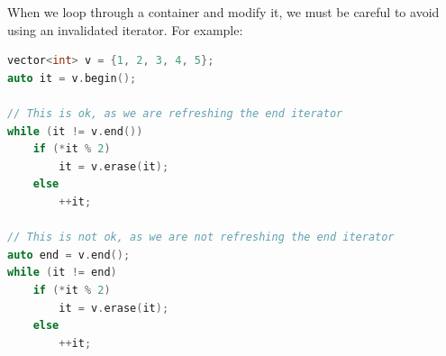 When we loop through a container and modify it, we must be careful to avoid using an invalidated
iterator. For example:

\begin{lstlisting}[language=C++]
vector<int> v = {1, 2, 3, 4, 5};
auto it = v.begin();

// This is ok, as we are refreshing the end iterator
while (it != v.end()) 
    if (*it % 2)
        it = v.erase(it);
    else
        ++it;

// This is not ok, as we are not refreshing the end iterator
auto end = v.end();
while (it != end)
    if (*it % 2)
        it = v.erase(it);
    else
        ++it;
\end{lstlisting}


